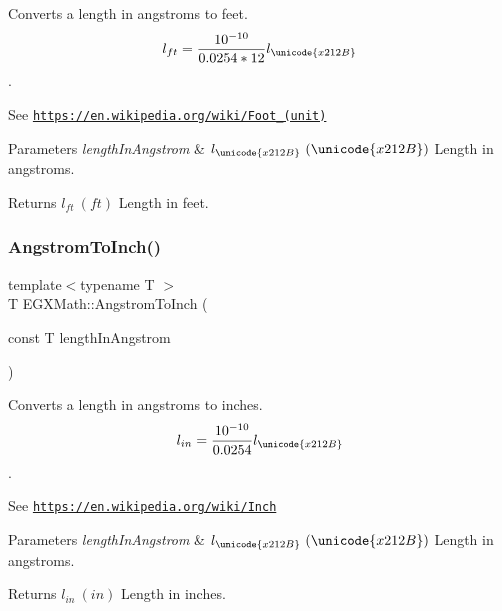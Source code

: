Converts a length in angstroms to feet. \[ l_{ft}= \frac{10^{-10}}{0.0254 * 12} l_{\unicode{x212B}} \]. 

See \href{https://en.wikipedia.org/wiki/Foot_(unit)}{\tt https\+://en.\+wikipedia.\+org/wiki/\+Foot\+\_\+(unit)} 
\begin{DoxyParams}{Parameters}
{\em length\+In\+Angstrom} & $ l_{\unicode{x212B}}\ (\unicode{x212B})$ Length in angstroms. \\
\hline
\end{DoxyParams}
\begin{DoxyReturn}{Returns}
$ l_{ft}\ (ft)$ Length in feet. 
\end{DoxyReturn}
\mbox{\label{group___e_g_x_math-_conversions-_length_conversions-_non-_s_i-_angstrom-_imperial_ga7866f39e7fdf861be15eda81aa1b3f0c}} 
\subsubsection{\texorpdfstring{Angstrom\+To\+Inch()}{AngstromToInch()}}
{\footnotesize\ttfamily template$<$typename T $>$ \\
T E\+G\+X\+Math\+::\+Angstrom\+To\+Inch (\begin{DoxyParamCaption}\item[{const T}]{length\+In\+Angstrom }\end{DoxyParamCaption})}



Converts a length in angstroms to inches. \[ l_{in}= \frac{10^{-10}}{0.0254} l_{\unicode{x212B}} \]. 

See \href{https://en.wikipedia.org/wiki/Inch}{\tt https\+://en.\+wikipedia.\+org/wiki/\+Inch} 
\begin{DoxyParams}{Parameters}
{\em length\+In\+Angstrom} & $ l_{\unicode{x212B}}\ (\unicode{x212B})$ Length in angstroms. \\
\hline
\end{DoxyParams}
\begin{DoxyReturn}{Returns}
$ l_{in}\ (in)$ Length in inches. 
\end{DoxyReturn}
\mbox{\label{group___e_g_x_math-_conversions-_length_conversions-_non-_s_i-_angstrom-_imperial_gae8d17e18786a104634ccfa6b9f46f314}} 
